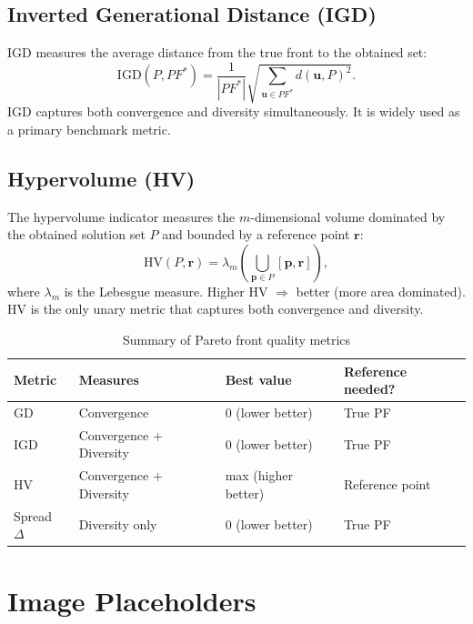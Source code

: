 \documentclass[12pt,a4paper]{article}
\begin{document}
\subsection{Inverted Generational Distance (IGD)}

IGD measures the average distance from the true front to the obtained set:
\begin{equation}
    \text{IGD}(P, PF^*) = \frac{1}{|PF^*|} \sqrt{ \sum_{\mathbf{u} \in PF^*} d(\mathbf{u}, P)^2 }.
\end{equation}
IGD captures both convergence and diversity simultaneously. It is widely used as a primary benchmark metric.

\subsection{Hypervolume (HV)}

The hypervolume indicator measures the $m$-dimensional volume dominated by the obtained solution set $P$ and bounded by a reference point $\mathbf{r}$:
\begin{equation}
    \text{HV}(P, \mathbf{r}) = \lambda_m\!\left( \bigcup_{\mathbf{p} \in P} [\mathbf{p}, \mathbf{r}] \right),
\end{equation}
where $\lambda_m$ is the Lebesgue measure. Higher HV $\Rightarrow$ better (more area dominated). HV is the only unary metric that captures both convergence and diversity.

\begin{table}[H]
\centering
\caption{Summary of Pareto front quality metrics}
\label{tab:metrics}
\renewcommand{\arraystretch}{1.3}
\begin{tabular}{p{3cm} p{4cm} p{3cm} p{3cm}}
\toprule
\textbf{Metric} & \textbf{Measures} & \textbf{Best value} & \textbf{Reference needed?} \\
\midrule
GD  & Convergence & 0 (lower better) & True PF \\
IGD & Convergence + Diversity & 0 (lower better) & True PF \\
HV  & Convergence + Diversity & max (higher better) & Reference point \\
Spread $\Delta$ & Diversity only & 0 (lower better) & True PF \\
\bottomrule
\end{tabular}
\end{table}

\section{Image Placeholders}
\label{sec:images}
\end{document}
